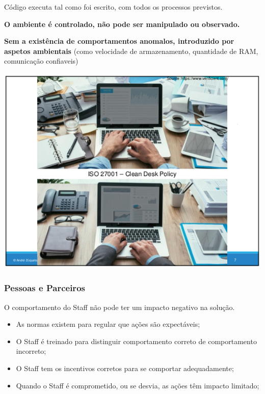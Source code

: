 \documentclass{article}
\begin{document}
Código executa tal como foi escrito, com todos os processos previstos.

\begin{flushleft}
  \textbf{O ambiente é controlado, não pode ser manipulado ou observado.}

  \textbf{Sem a existência de comportamentos anomalos, introduzido por aspetos ambientais} (como velocidade de armazenamento,
  quantidade de RAM, comunicação confiaveis)
\end{flushleft}

\begin{center}
  \includegraphics[scale=0.4]{1}
\end{center}

\subsubsection{Pessoas e Parceiros}

O comportamento do Staff não pode ter um impacto negativo na solução.

\begin{flushleft}
  \begin{itemize}
    \item As normas existem para regular que ações são expectáveis;
    \item O Staff é treinado para distinguir comportamento correto de comportamento incorreto;
    \item O Staff tem os incentivos corretos para se comportar adequadamente;
    \item Quando o Staff é comprometido, ou se desvia, as ações têm impacto limitado;
  \end{itemize}
\end{flushleft}
\end{document}
